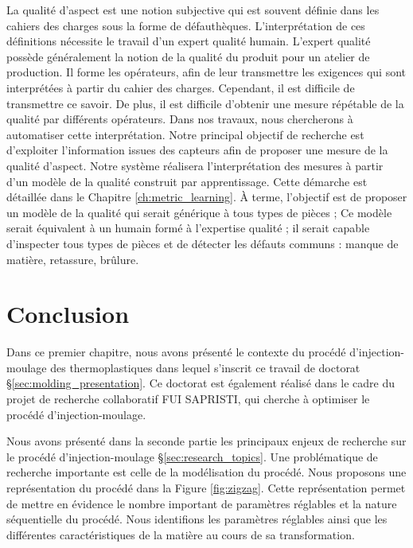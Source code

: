 La qualité d'aspect est une notion subjective qui est souvent définie dans les cahiers des charges sous la forme de défauthèques.
L'interprétation de ces définitions nécessite le travail d'un expert qualité humain.
L'expert qualité possède généralement la notion de la qualité du produit pour un atelier de production.
Il forme les opérateurs, afin de leur transmettre les exigences qui sont interprétées à partir du cahier des charges.
Cependant, il est difficile de transmettre ce savoir.
De plus, il est difficile d'obtenir une mesure répétable de la qualité par différents opérateurs.
Dans nos travaux, nous chercherons à automatiser cette interprétation.
Notre principal objectif de recherche est d'exploiter l'information issues des capteurs afin de proposer une mesure de la qualité d'aspect.
Notre système réalisera l'interprétation des mesures à partir d'un modèle de la qualité construit par apprentissage.
Cette démarche est détaillée dans le Chapitre \ref{ch:metric_learning}.
À terme, l'objectif est de proposer un modèle de la qualité qui serait générique à tous types de pièces ;
Ce modèle serait équivalent à un humain formé à l'expertise qualité ; il serait capable d'inspecter tous types de pièces et de détecter les défauts communs : manque de matière, retassure, brûlure.


\section{Conclusion}
Dans ce premier chapitre, nous avons présenté le contexte du procédé d'injection-moulage des thermoplastiques dans lequel s’inscrit ce travail de doctorat §\ref{sec:molding_presentation}.
Ce doctorat est également réalisé dans le cadre du projet de recherche collaboratif FUI SAPRISTI, qui cherche à optimiser le procédé d'injection-moulage.

Nous avons présenté dans la seconde partie les principaux enjeux de recherche sur le procédé d'injection-moulage §\ref{sec:research_topics}.
Une problématique de recherche importante est celle de la modélisation du procédé.
Nous proposons une représentation du procédé dans la Figure \ref{fig:zigzag}.
Cette représentation permet de mettre en évidence le nombre important de paramètres réglables et la nature séquentielle du procédé.
Nous identifions les paramètres réglables ainsi que les différentes caractéristiques de la matière au cours de sa transformation.

